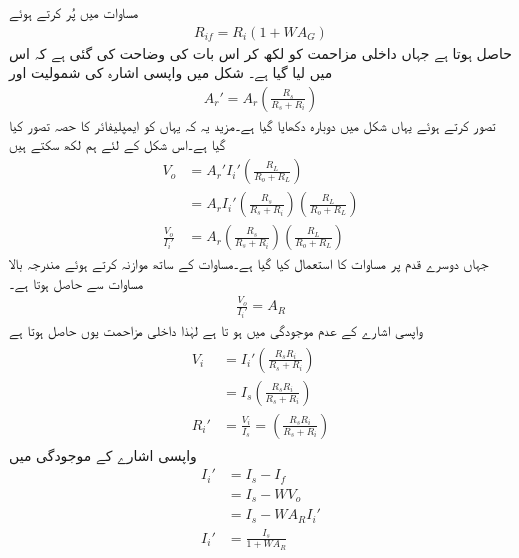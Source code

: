 مساوات  میں  پُر کرتے ہوئے
\begin{align}
R_{if}={R_i} \left({1+W A_G} \right )
\end{align}
حاصل ہوتا ہے جہاں داخلی مزاحمت کو  لکھ کر اس بات کی وضاحت کی گئی ہے کہ اس میں  لیا گیا ہے۔
شکل  میں واپسی اشارہ  کی شمولیت اور
\begin{align} \label{مساوات_واپسی_مزاحمت_نما_افزائش_بمع_اشارہ_مزاحمت}
A_r' = A_r \left( \frac{R_s}{R_s+R_i} \right )
\end{align}
تصور کرتے ہوئے یہاں شکل  میں دوبارہ دکھایا گیا ہے۔مزید یہ کہ یہاں  کو ایمپلیفائر کا حصہ تصور کیا گیا ہے۔اس شکل کے لئے ہم لکھ سکتے ہیں
\begin{align*}
V_o&=A_r' I_i' \left (\frac{R_L}{R_o+R_L} \right )\\
&=A_r  I_i' \left( \frac{R_s}{R_s+R_i} \right ) \left (\frac{R_L}{R_o+R_L} \right ) \\
\frac{V_o}{I_i'}&=A_r  \left( \frac{R_s}{R_s+R_i} \right ) \left (\frac{R_L}{R_o+R_L} \right )
\end{align*}
جہاں دوسرے قدم پر مساوات  کا استعمال کیا گیا ہے۔مساوات  کے ساتھ موازنہ  کرتے ہوئے مندرجہ بالا مساوات سے حاصل ہوتا ہے۔
\begin{align} \label{مساوات_واپسی_مزاحمت_نما_افزائش_ب}
\frac{V_o}{I_i'}=A_R
\end{align}
واپسی اشارے کے عدم موجودگی میں  ہو تا ہے لہٰذا  داخلی مزاحمت  یوں حاصل ہوتا ہے 
\begin{gather}
\begin{aligned}
V_i &=I_i' \left (\frac{R_s R_i}{R_s +R_i} \right ) \\
&=I_s \left (\frac{R_s R_i}{R_s +R_i} \right ) \\
R_i'&=\frac{V_i}{I_s}= \left (\frac{R_s R_i}{R_s +R_i} \right )
\end{aligned}
\end{gather}
واپسی اشارے کے موجودگی میں
\begin{align*}
I_i'&=I_s-I_f\\
&=I_s-W V_o \\
&=I_s-W A_R I_i'\\
I_i'&=\frac{I_s}{1+W A_R}
\end{align*}
